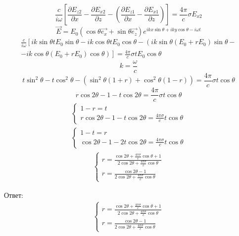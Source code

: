 \documentclass[12pt]{article}
\begin{document}
\begin{large}
\[\]
\[
    \frac{c}{i \omega} \left[  \frac{\partial E_{z2}}{\partial x} - \frac{\partial E_{x2}}{\partial z} - \left( \frac{\partial E_{z1}}{\partial x} - \frac{\partial E_{x1}}{\partial z} \right) \right] = \frac{4\pi}{c} \sigma E_{x2}
\]
\[
    \overrightarrow{E} = E_0 \left( \cos \theta \vec{e_x} + \sin \theta \vec{e_z} \right) e^{ikx\sin \theta  + ik y\cos \theta  - i\omega t}
\]
\begin{eqnarray*}
    \frac{c}{i \omega} \left[ ik \sin \theta t E_0 \sin \theta - ik \cos \theta t E_0 \cos \theta - \left( ik \sin \theta \left( E_0 + r E_0 \right) \sin \theta - \right. \right. \\
    \left. \left. - ik \cos \theta \left( E_0 + r E_0 \right) \cos \theta \right) \right] = \frac{4\pi}{c} \sigma t E_0 \cos \theta
\end{eqnarray*}
\[
    k = \frac{\omega}{c}
\]
\[
    t \sin^2 \theta - t \cos^2 \theta - \left( \sin^2 \theta \left( 1 + r \right) + \cos^2 \theta \left( 1 - r \right) \right) = \frac{4\pi}{c} \sigma t \cos \theta
\]
\[
    r \cos 2\theta - 1 - t\cos 2\theta = \frac{4\pi}{c} \sigma t \cos \theta
\]
\begin{eqnarray*}
    \begin{cases}
        1 - r = t \\
        r \cos 2\theta - 1 - t\cos 2\theta = \frac{4\pi \sigma}{c} t \cos \theta
    \end{cases}
\end{eqnarray*}
\begin{eqnarray*}
    \begin{cases}
        1 - t = r \\
        \cos 2\theta - 1 - 2 t\cos 2\theta = \frac{4\pi \sigma}{c} t \cos \theta
    \end{cases}
\end{eqnarray*}
\begin{eqnarray*}
    \begin{cases}
        r = \frac{\cos 2\theta + \frac{4\pi \sigma}{c} \cos \theta +1 }{2\cos 2\theta + \frac{4\pi \sigma}{c} \cos \theta} \\
        r = \frac{\cos 2\theta -1 }{2\cos 2\theta + \frac{4\pi \sigma}{c} \cos \theta}
    \end{cases}
\end{eqnarray*}
\par Ответ:
\begin{eqnarray*}
    \begin{cases}
        r = \frac{\cos 2\theta + \frac{4\pi \sigma}{c} \cos \theta +1 }{2\cos 2\theta + \frac{4\pi \sigma}{c} \cos \theta} \\
        r = \frac{\cos 2\theta -1 }{2\cos 2\theta + \frac{4\pi \sigma}{c} \cos \theta}
    \end{cases}
\end{eqnarray*}
\par
\par
\end{large}
\end{document}
